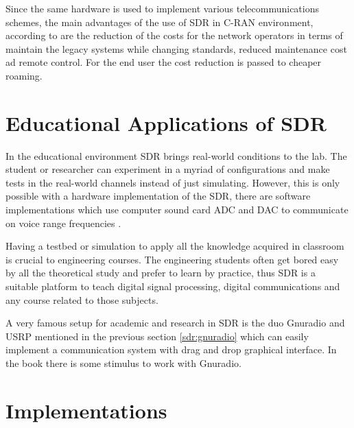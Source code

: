 Since the same hardware is used to implement various telecommunications schemes,
the main advantages of the use of SDR in C-RAN environment, according to
\cite{dayananda2012} are the reduction of the costs for the network operators in
terms of maintain the legacy systems while changing standards, reduced
maintenance cost ad remote control. For the end user the cost reduction is
passed to cheaper roaming.



\section{Educational Applications of SDR}

In the educational environment SDR brings real-world conditions to the lab. The
student or researcher can experiment in a myriad of configurations and make
tests in the real-world channels instead of just simulating. However, this is
only possible with a hardware implementation of the SDR, there are software
implementations which use computer sound card ADC and DAC to communicate on
voice range frequencies \cite{ladimer2009}.

Having a testbed or simulation to apply all the knowledge acquired in classroom
is crucial to engineering courses. The engineering students often get bored easy
by all the theoretical study and prefer to learn by practice, thus SDR is a
suitable platform to teach digital signal processing, digital communications and
any course related to those subjects.

A very famous setup for academic and research in SDR is the duo Gnuradio
\cite{web:gnuradio} and USRP \cite{web:usrp} mentioned in the previous section
\ref{sdr:gnuradio} which can easily implement a communication system with drag
and drop graphical interface. In the book \cite{akbook} there is some stimulus
to work with Gnuradio.


\section{Implementations}
\label{sdr:implement}

